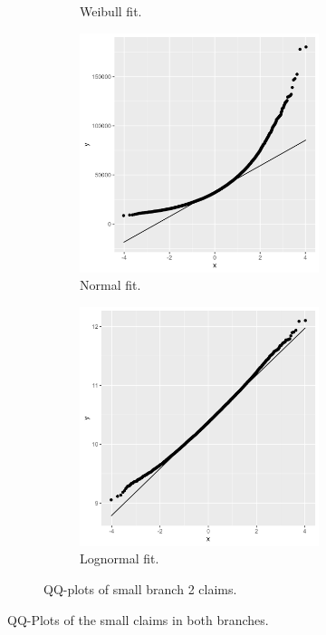 \documentclass[11pt]{article}
\begin{document}
\begin{figure}[!h]
\begin{subfigure}{.49\textwidth}
\begin{subfigure}{.5\textwidth}
      \caption{Weibull fit.}
    \end{subfigure}
    \begin{subfigure}{.5\textwidth}
      \centering
      \includegraphics[width=.9\linewidth]{plots/claim_type2/qqplot_normal_small.png}
      \caption{Normal fit.}
    \end{subfigure}%
    \begin{subfigure}{.5\textwidth}
      \centering
      \includegraphics[width=.9\linewidth]{plots/claim_type2/qqplot_lognormality_small.png}
      \caption{Lognormal fit.}
    \end{subfigure}
    \caption{QQ-plots of small branch 2 claims.}
\end{subfigure}
    \caption{QQ-Plots of the small claims in both branches.}
    \label{a2:smallqq}
\end{figure}
\end{document}
